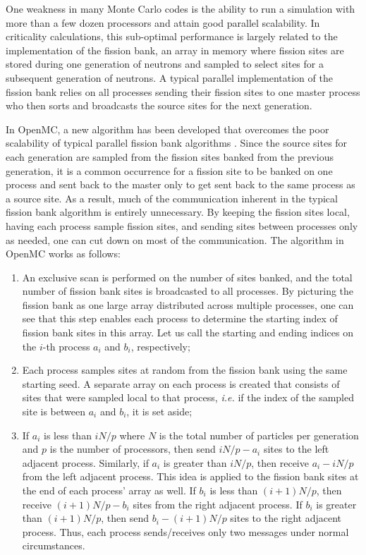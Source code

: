 \documentclass{elsarticle}
\begin{document}
One weakness in many Monte Carlo codes is the ability to run a simulation with
more than a few dozen processors and attain good parallel scalability. In
criticality calculations, this sub-optimal performance is largely related to the
implementation of the fission bank, an array in memory where fission sites are
stored during one generation of neutrons and sampled to select sites for a
subsequent generation of neutrons. A typical parallel implementation of the
fission bank relies on all processes sending their fission sites to one master
process who then sorts and broadcasts the source sites for the next generation.

In OpenMC, a new algorithm has been developed that overcomes the poor
scalability of typical parallel fission bank algorithms
\cite{fissionbank}. Since the source sites for each generation are sampled from
the fission sites banked from the previous generation, it is a common occurrence
for a fission site to be banked on one process and sent back to the master only
to get sent back to the same process as a source site. As a result, much of the
communication inherent in the typical fission bank algorithm is entirely
unnecessary. By keeping the fission sites local, having each process sample
fission sites, and sending sites between processes only as needed, one can cut
down on most of the communication. The algorithm in OpenMC works as follows:

\begin{enumerate}
\item An exclusive scan is performed on the number of sites banked, and the
  total number of fission bank sites is broadcasted to all processes. By
  picturing the fission bank as one large array distributed across multiple
  processes, one can see that this step enables each process to determine the
  starting index of fission bank sites in this array. Let us call the starting
  and ending indices on the $i$-th process $a_i$ and $b_i$, respectively;
\item Each process samples sites at random from the fission bank using the same
  starting seed. A separate array on each process is created that consists of
  sites that were sampled local to that process, {\em i.e.} if the index of the
  sampled site is between $a_i$ and $b_i$, it is set aside;
\item If $a_i$ is less than $iN/p$ where $N$ is the total number of particles
  per generation and $p$ is the number of processors, then send $iN/p - a_i$
  sites to the left adjacent process. Similarly, if $a_i$ is greater than
  $iN/p$, then receive $a_i - iN/p$ from the left adjacent process. This idea is
  applied to the fission bank sites at the end of each process' array as
  well. If $b_i$ is less than $(i+1)N/p$, then receive $(i+1)N/p - b_i$ sites
  from the right adjacent process. If $b_i$ is greater than $(i+1)N/p$, then
  send $b_i - (i+1)N/p$ sites to the right adjacent process. Thus, each process
  sends/receives only two messages under normal circumstances.
\end{enumerate}
\end{document}
